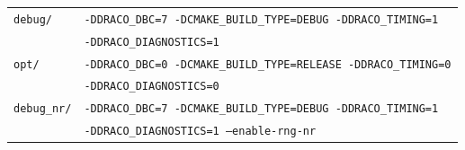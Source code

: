 \documentclass[note]{ResearchNote_pdf}
\begin{document}
\begin{center}
  \footnotesize
  \begin{tabular}{lp{4.0in}}
    \hline\hline
\texttt{debug/}  
     & \texttt{-DDRACO\_DBC=7 -DCMAKE\_BUILD\_TYPE=DEBUG  -DDRACO\_TIMING=1} \\
     & \texttt{-DDRACO\_DIAGNOSTICS=1} \\


\texttt{opt/}  
     & \texttt{-DDRACO\_DBC=0 -DCMAKE\_BUILD\_TYPE=RELEASE  -DDRACO\_TIMING=0} \\
     & \texttt{-DDRACO\_DIAGNOSTICS=0} \\


\texttt{debug\_nr/}  
     & \texttt{-DDRACO\_DBC=7 -DCMAKE\_BUILD\_TYPE=DEBUG  -DDRACO\_TIMING=1} \\
     & \texttt{-DDRACO\_DIAGNOSTICS=1 --enable-rng-nr} \\





    \hline\hline
  \end{tabular}
\end{center}
\end{document}

